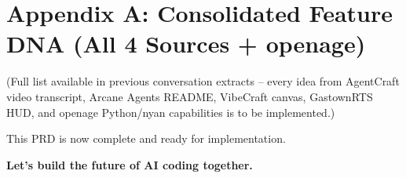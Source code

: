 \documentclass[11pt,a4paper]{article}
\begin{document}
\newpage
\section{Appendix A: Consolidated Feature DNA (All 4 Sources + openage)}

(Full list available in previous conversation extracts – every idea from AgentCraft video transcript, Arcane Agents README, VibeCraft canvas, GastownRTS HUD, and openage Python/nyan capabilities is to be implemented.)

This PRD is now complete and ready for implementation.

\textbf{Let's build the future of AI coding together.}
\end{document}
